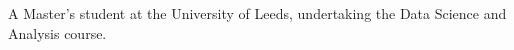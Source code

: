 

\begin{cvparagraph}

A Master’s student at the University of Leeds, undertaking the Data Science and Analysis course.
\end{cvparagraph}